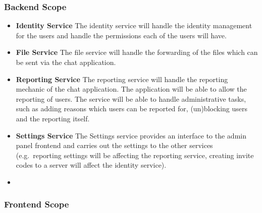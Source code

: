 \subsubsection{Backend Scope}
\begin{itemize}
    \item \textbf{Identity Service}
    The identity service will handle the identity management for the users and handle the permissions each of the users
    will have.
    \item \textbf{File Service}
    The file service will handle the forwarding of the files which can be sent via the chat application.
    \item \textbf{Reporting Service}
    The reporting service will handle the reporting mechanic of the chat application.
    The application will be able to allow the reporting of users.
    The service will be able to handle administrative tasks, such as adding reasons which users can be reported for,
    (un)blocking users and the reporting itself.
    \item \textbf{Settings Service}
    The Settings service provides an interface to the admin panel frontend and carries out the settings to the other
    services (e.g.\ reporting settings will be affecting the reporting service, creating invite codes to a server will
    affect the identity service).
    \item
\end{itemize}

\subsubsection{Frontend Scope}

